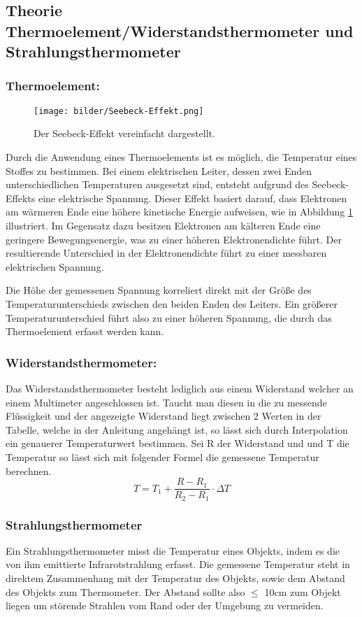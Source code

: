     \subsection{Theorie Thermoelement/Widerstandsthermometer und Strahlungsthermometer}
    \subsubsection*{Thermoelement:}
    	\begin{figure}[ht]
    	\label{fig:abb2}
    	\begin{center}
    		\texttt{[image: bilder/Seebeck-Effekt.png]}
    		\caption{Der Seebeck-Effekt vereinfacht dargestellt.}
    	\end{center}
    \end{figure}
    Durch die Anwendung eines Thermoelements ist es möglich, die Temperatur eines Stoffes zu bestimmen. Bei einem elektrischen Leiter, dessen zwei Enden unterschiedlichen Temperaturen ausgesetzt sind, entsteht aufgrund des Seebeck-Effekts eine elektrische Spannung. Dieser Effekt basiert darauf, dass Elektronen am wärmeren Ende eine höhere kinetische Energie aufweisen, wie in Abbildung \ref{fig:abb2} illustriert. Im Gegensatz dazu besitzen Elektronen am kälteren Ende eine geringere Bewegungsenergie, was zu einer höheren Elektronendichte führt. Der resultierende Unterschied in der Elektronendichte führt zu einer messbaren elektrischen Spannung.
    
   Die Höhe der gemessenen Spannung korreliert direkt mit der Größe des Temperaturunterschieds zwischen den beiden Enden des Leiters. Ein größerer Temperaturunterschied führt also zu einer höheren Spannung, die durch das Thermoelement erfasst werden kann.
   \subsubsection*{Widerstandsthermometer:}
   Das Widerstandsthermometer besteht lediglich aus einem Widerstand welcher an einem Multimeter angeschlossen ist. Taucht man diesen in die zu messende Flüssigkeit und der angezeigte Widerstand liegt zwischen 2 Werten in der Tabelle, welche in der Anleitung angehängt ist, so lässt sich durch Interpolation ein genauerer Temperaturwert bestimmen. Sei R der Widerstand und und T die Temperatur so lässt sich mit folgender Formel die gemessene Temperatur berechnen.
   $$T = T_{1} + \frac{R - R_{1}}{R_{2} - R_{1}} \cdot \Delta T$$
   \subsubsection*{Strahlungsthermometer}
   Ein Strahlungsthermometer misst die Temperatur eines Objekts, indem es die von ihm emittierte Infrarotstrahlung erfasst. Die gemessene Temperatur steht in direktem Zusammenhang mit der Temperatur des Objekts, sowie dem Abstand des Objekts zum Thermometer.  Der Abstand sollte also $\leq$ 10cm zum Objekt liegen um störende Strahlen vom Rand oder der Umgebung zu vermeiden. 

